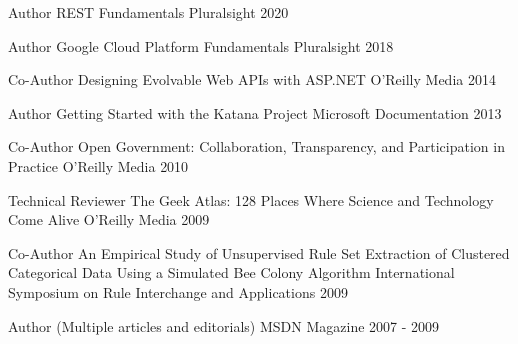


\begin{cventries}


\cventry
{Author}
{REST Fundamentals}
{Pluralsight}
{2020}
{
}
  

\cventry
{Author}
{Google Cloud Platform Fundamentals}
{Pluralsight}
{2018}
{
}


\cventry
{Co-Author}
{Designing Evolvable Web APIs with ASP.NET}
{O'Reilly Media}
{2014}
{
}


\cventry
{Author}
{Getting Started with the Katana Project}
{Microsoft Documentation}
{2013}
{
}


\cventry
{Co-Author}
{Open Government: Collaboration, Transparency, and Participation in Practice}
{O'Reilly Media}
{2010}
{
}


\cventry
{Technical Reviewer}
{The Geek Atlas: 128 Places Where Science and Technology Come Alive}
{O'Reilly Media}
{2009}
{
}


\cventry
{Co-Author}
{An Empirical Study of Unsupervised Rule Set Extraction of Clustered Categorical Data Using a Simulated Bee Colony Algorithm}
{International Symposium on Rule Interchange and Applications}
{2009}
{
}


\cventry
{Author}
{(Multiple articles and editorials)}
{MSDN Magazine}
{2007 - 2009}
{
}


\end{cventries}